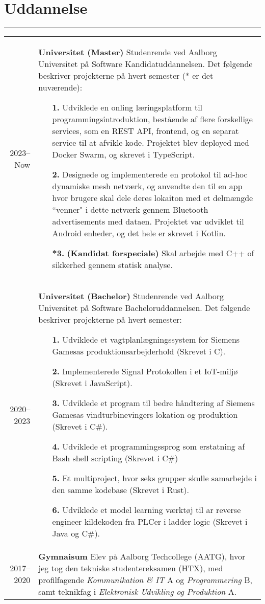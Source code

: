 \documentclass[a4paper]{report}
\def\secsep{\hrule width5cm}
\begin{document}
\newcommand{\p}[1]{\textbf{#1}\mbox{}\newline}
\def\n{\\\\}
\section*{Uddannelse}
\secsep
\begin{longtabu} to \textwidth {r|X}
    2023--Now & \p{Universitet (Master)}
    Studenrende ved Aalborg Universitet på Software Kandidatuddannelsen. Det følgende beskriver projekterne på hvert semester (* er det nuværende):
    \begin{itemize}[leftmargin=4em]
        \item[\textbf{1.}] Udviklede en onling læringsplatform til programmingsintroduktion, bestående af flere forskellige services, som en REST API, frontend, og en separat service til at afvikle kode.
            Projektet blev deployed med Docker Swarm, og skrevet i TypeScript.
        \item[\textbf{2.}] Designede  og implementerede en protokol til ad-hoc dynamiske mesh netværk, og anvendte den til en app hvor brugere skal dele deres lokaiton med et delmængde ``venner" i dette netværk gennem Bluetooth advertisements med dataen. Projektet var udviklet til Android enheder, og det hele er skrevet i Kotlin.
        \item[\textbf{*3.}] \textbf{(Kandidat forspeciale)} Skal arbejde med C++ of sikkerhed gennem statisk analyse.
    \end{itemize}
    \\
    2020--2023 & \p{Universitet (Bachelor)}
    Studenrende ved Aalborg Universitet på Software Bacheloruddannelsen. Det følgende beskriver projekterne på hvert semester:
    \begin{itemize}[leftmargin=4em]
        \item[\textbf{1.}] Udviklede et vagtplanlægningssystem for Siemens Gamesas produktionsarbejderhold (Skrevet i C).
        \item[\textbf{2.}] Implementerede Signal Protokollen i et IoT-miljø (Skrevet i JavaScript).
        \item[\textbf{3.}] Udviklede et program til bedre håndtering af Siemens Gamesas vindturbinevingers lokation og produktion (Skrevet i C\#).
        \item[\textbf{4.}] Udviklede et programmingssprog som erstatning af Bash shell scripting (Skrevet i C\#)
        \item[\textbf{5.}] Et multiproject, hvor seks grupper skulle samarbejde i den samme kodebase (Skrevet i Rust).
        \item[\textbf{6.}] Udviklede et model learning værktøj til ar reverse engineer kildekoden fra PLCer i ladder logic (Skrevet i Java og C\#).
    \end{itemize}
    \\
    2017--2020 & \p{Gymnaisum} 
    Elev på Aalborg Techcollege (AATG), hvor jeg tog den tekniske studentereksamen (HTX),
    med profilfagende \textit{Kommunikation \& IT} A og \textit{Programmering} B,
    samt teknikfag i \textit{Elektronisk Udvikling og Produktion} A.
\end{longtabu}
\end{document}
